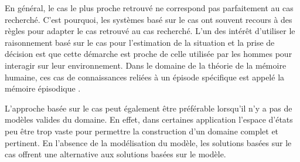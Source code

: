 \documentclass[a4paper,11pt,twoside]{StyleThese}
\begin{document}
En général, le cas le plus proche retrouvé ne correspond pas parfaitement au cas recherché. C'est pourquoi, les systèmes basé sur le cas ont souvent recours à des règles pour adapter le cas retrouvé au cas recherché.
L'un des intérêt d'utiliser le raisonnement basé sur le cas pour l'estimation de la situation et la prise de décision est que cette démarche est proche de celle utilisée par les hommes pour interagir sur leur environnement. Dans le domaine de la théorie de la mémoire humaine, ces cas de connaissances reliées à un épisode spécifique est appelé la mémoire épisodique \cite{tulving1972episodic}.

L'approche basée sur le cas peut également être préférable lorsqu'il n'y a pas de modèles valides du domaine. En effet, dans certaines application l'espace d'états peu être trop vaste pour permettre la construction d'un domaine complet et pertinent. En l'absence de la modélisation du modèle, les solutions basées sur le cas offrent une alternative aux solutions basées sur le modèle.





\end{document}
